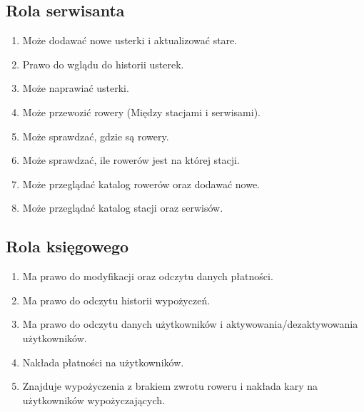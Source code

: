 \documentclass{article}
\begin{document}
\subsection{Rola serwisanta}
\begin{enumerate}
	\item Może dodawać nowe usterki i aktualizować stare.
	\item Prawo do wglądu do historii usterek.
	\item Może naprawiać usterki.
	\item Może przewozić rowery (Między stacjami i serwisami).
	\item Może sprawdzać, gdzie są rowery.
	\item Może sprawdzać, ile rowerów jest na której stacji.
	\item Może przeglądać katalog rowerów oraz dodawać nowe.
	\item Może przeglądać katalog stacji oraz serwisów.
\end{enumerate}

\subsection{Rola księgowego}
\begin{enumerate}
	\item Ma prawo do modyfikacji oraz odczytu danych płatności.
	\item Ma prawo do odczytu historii wypożyczeń.
	\item Ma prawo do odczytu danych użytkowników i aktywowania/dezaktywowania użytkowników.
	\item Nakłada płatności na użytkowników.
	\item Znajduje wypożyczenia z brakiem zwrotu roweru i nakłada kary na użytkowników wypożyczających.
\end{enumerate}
\end{document}

